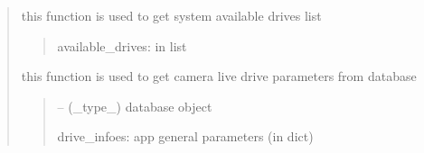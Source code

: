 \documentclass[letterpaper,10pt,english]{sphinxmanual}
\begin{document}
\begin{quote}
\begin{savenotes}\begin{fulllineitems}
\label{\detokenize{setting/backend/storage_funcs:oxin.backend.storage_funcs.get_available_drives}}
\pysigstartsignatures
{}
\pysigstopsignatures
\sphinxAtStartPar
this function is used to get system available drives list
\begin{quote}\begin{description}
\sphinxAtStartPar
available\_drives: in list

\end{description}\end{quote}

\end{fulllineitems}\end{savenotes}


\begin{savenotes}\begin{fulllineitems}
\label{\detokenize{setting/backend/storage_funcs:oxin.backend.storage_funcs.get_camera_live_drive_parameters_from_db}}
\pysigstartsignatures
{}
\pysigstopsignatures
\sphinxAtStartPar
this function is used to get camera live drive parameters from database
\begin{quote}\begin{description}
\sphinxAtStartPar
{} – (\_type\_) database object

\sphinxAtStartPar
drive\_infoes: app general parameters (in dict)

\end{description}\end{quote}

\end{fulllineitems}\end{savenotes}



\end{quote}
\end{document}
